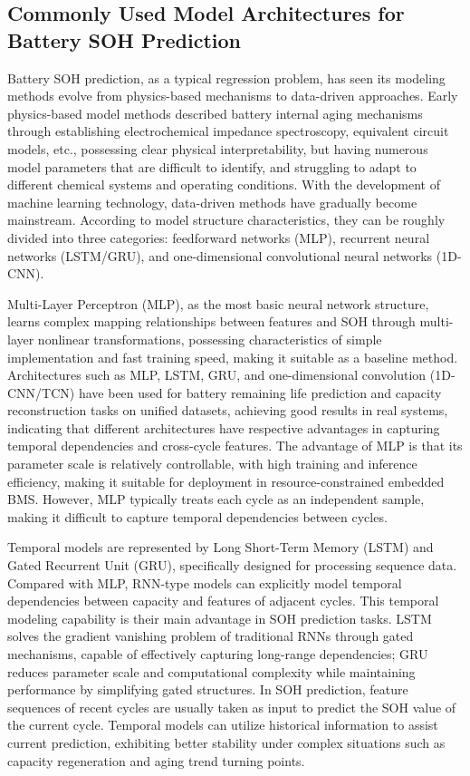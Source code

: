 \documentclass[10pt,a4paper]{article}
\begin{document}
\subsection{Commonly Used Model Architectures for Battery SOH Prediction}

Battery SOH prediction, as a typical regression problem, has seen its modeling methods evolve from physics-based mechanisms to data-driven approaches\cite{liu2025deep}. Early physics-based model methods described battery internal aging mechanisms through establishing electrochemical impedance spectroscopy, equivalent circuit models, etc., possessing clear physical interpretability, but having numerous model parameters that are difficult to identify, and struggling to adapt to different chemical systems and operating conditions. With the development of machine learning technology, data-driven methods have gradually become mainstream\cite{liu2025deep}. According to model structure characteristics, they can be roughly divided into three categories: feedforward networks (MLP), recurrent neural networks (LSTM/GRU), and one-dimensional convolutional neural networks (1D-CNN).

Multi-Layer Perceptron (MLP), as the most basic neural network structure, learns complex mapping relationships between features and SOH through multi-layer nonlinear transformations, possessing characteristics of simple implementation and fast training speed, making it suitable as a baseline method\cite{bairwa2025cycle}. Architectures such as MLP, LSTM, GRU, and one-dimensional convolution (1D-CNN/TCN) have been used for battery remaining life prediction and capacity reconstruction tasks on unified datasets, achieving good results in real systems\cite{bairwa2025cycle}, indicating that different architectures have respective advantages in capturing temporal dependencies and cross-cycle features. The advantage of MLP is that its parameter scale is relatively controllable, with high training and inference efficiency, making it suitable for deployment in resource-constrained embedded BMS. However, MLP typically treats each cycle as an independent sample, making it difficult to capture temporal dependencies between cycles.

Temporal models are represented by Long Short-Term Memory (LSTM) and Gated Recurrent Unit (GRU), specifically designed for processing sequence data\cite{bairwa2025cycle}. Compared with MLP, RNN-type models can explicitly model temporal dependencies between capacity and features of adjacent cycles. This temporal modeling capability is their main advantage in SOH prediction tasks. LSTM solves the gradient vanishing problem of traditional RNNs through gated mechanisms, capable of effectively capturing long-range dependencies; GRU reduces parameter scale and computational complexity while maintaining performance by simplifying gated structures. In SOH prediction, feature sequences of recent cycles are usually taken as input to predict the SOH value of the current cycle. Temporal models can utilize historical information to assist current prediction, exhibiting better stability under complex situations such as capacity regeneration and aging trend turning points.
\end{document}
